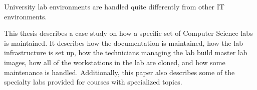 \thispagestyle{empty}

University lab environments are handled quite differently from other IT environments.  

This thesis describes a case study on how a specific set of Computer Science labs is maintained.  It describes how the documentation is maintained, how the lab infrastructure is set up, how the technicians managing the lab build master lab images, how all of the workstations in the lab are cloned, and how some maintenance is handled.  Additionally, this paper also describes some of the specialty labs provided for courses with specialized topics. 
